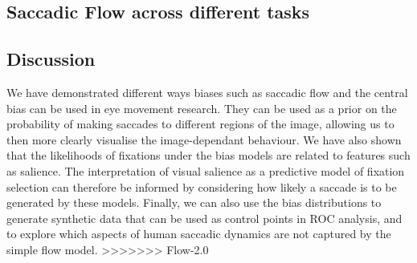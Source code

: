 \subsection{Saccadic Flow across different tasks}


\subsection{Discussion}

We have demonstrated different ways biases such as saccadic flow and the central bias can be used in eye movement research. They can be used as a prior on the probability of making saccades to different regions of the image, allowing us to then more clearly visualise the image-dependant behaviour. We have also shown that the likelihoods of fixations under the bias models are related to features such as salience. The interpretation of visual salience as a predictive model of fixation selection can therefore be informed by considering how likely a saccade is to be generated by these models. Finally, we can also use the bias distributions to generate synthetic data that can be used as control points in ROC analysis, and to explore which aspects of human saccadic dynamics are not captured by the simple flow model. 
>>>>>>> Flow-2.0
